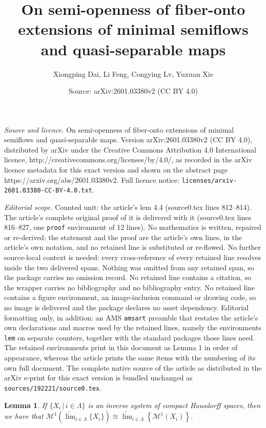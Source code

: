 \documentclass[10pt,a4paper]{amsart}
\title{On semi-openness of fiber-onto extensions of minimal semiflows and quasi-separable maps}
\author{Xiongping Dai, Li Feng, Congying Lv, Yuxuan Xie}
\date{Source: arXiv:2601.03380v2 (CC BY 4.0)}
\newtheorem{lem}{Lemma}
\begin{document}
\maketitle

\noindent\emph{Source and licence.} On semi-openness of fiber-onto extensions of minimal semiflows and quasi-separable maps. Version arXiv:2601.03380v2 (CC BY 4.0), distributed by arXiv under the Creative Commons Attribution 4.0 International licence, http://creativecommons.org/licenses/by/4.0/, as recorded in the arXiv licence metadata for this exact version and shown on the abstract page https://arxiv.org/abs/2601.03380v2. Full licence notice: \texttt{licenses/arxiv-2601.03380-CC-BY-4.0.txt}.\par\smallskip

\noindent\textit{Editorial scope.} Counted unit: the article's lem 4.4 (source0.tex lines 812--814). The article's complete original proof of it is delivered with it (source0.tex lines 816--827, one \texttt{proof} environment of 12 lines). No mathematics is written, repaired or re-derived: the statement and the proof are the article's own lines, in the article's own notation, and no retained line is substituted or re-flowed.  No further source-local context is needed: every cross-reference of every retained line resolves inside the two delivered spans.  Nothing was omitted from any retained span, so the package carries no omission record.  No retained line contains a citation, so the wrapper carries no bibliography and no bibliography entry.  No retained line contains a figure environment, an image-inclusion command or drawing code, so no image is delivered and the package declares no asset dependency.  Editorial formatting only, in addition: an AMS \texttt{amsart} preamble that restates the article's own declarations and macros used by the retained lines, namely the environments \texttt{lem} on separate counters, together with the standard packages those lines need.  The retained environments print in this document as Lemma 1 in order of appearance, whereas the article prints the same items with the numbering of its own full document.  The complete native source of the article as distributed in the arXiv e-print for this exact version is bundled unchanged as \texttt{sources/192221/source0.tex}.
\begin{lem}\label{4.4}
If $\{X_i\,|\,i\in\Lambda\}$ is an inverse system of compact Hausdorff spaces, then we have that $\mathcal{M}^1\left(\underleftarrow{\lim}_{i\in\Lambda}\{X_i\}\right)\cong\underleftarrow{\lim}_{i\in\Lambda}\left\{\mathcal{M}^1(X_i)\right\}$.
\end{lem}
\end{document}
